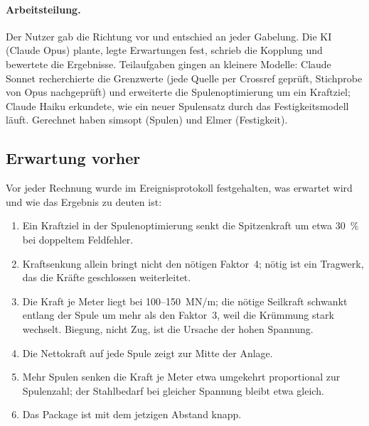 \paragraph{Arbeitsteilung.} Der Nutzer gab die Richtung vor und entschied an jeder Gabelung. Die KI (Claude Opus)
plante, legte Erwartungen fest, schrieb die Kopplung und bewertete die Ergebnisse. Teilaufgaben gingen an kleinere
Modelle: Claude Sonnet recherchierte die Grenzwerte (jede Quelle per Crossref geprüft, Stichprobe von Opus
nachgeprüft) und erweiterte die Spulenoptimierung um ein Kraftziel; Claude Haiku erkundete, wie ein neuer
Spulensatz durch das Festigkeitsmodell läuft. Gerechnet haben simsopt \cite{simsopt} (Spulen) und Elmer
\cite{elmer} (Festigkeit).

\subsection*{Erwartung vorher}
Vor jeder Rechnung wurde im Ereignisprotokoll festgehalten, was erwartet wird und wie das Ergebnis zu deuten ist:
\begin{enumerate}\itemsep1pt
\item Ein Kraftziel in der Spulenoptimierung senkt die Spitzenkraft um etwa 30~\% bei doppeltem Feldfehler.
\item Kraftsenkung allein bringt nicht den nötigen Faktor~4; nötig ist ein Tragwerk, das die Kräfte geschlossen
  weiterleitet.
\item Die Kraft je Meter liegt bei 100--150~MN/m; die nötige Seilkraft schwankt entlang der Spule um mehr als den
  Faktor~3, weil die Krümmung stark wechselt. Biegung, nicht Zug, ist die Ursache der hohen Spannung.
\item Die Nettokraft auf jede Spule zeigt zur Mitte der Anlage.
\item Mehr Spulen senken die Kraft je Meter etwa umgekehrt proportional zur Spulenzahl; der Stahlbedarf bei gleicher
  Spannung bleibt etwa gleich.
\item Das Package ist mit dem jetzigen Abstand knapp.
\end{enumerate}

